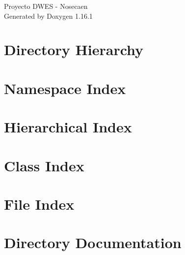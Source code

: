 \documentclass[twoside]{book}
\newcommand{\+}{\discretionary{\mbox{\scriptsize$\hookleftarrow$}}{}{}}
\newcommand{\clearemptydoublepage}{%
    \newpage{\pagestyle{empty}\cleardoublepage}%
  }
\begin{document}
  \raggedbottom
    \hypersetup{pageanchor=false,
                bookmarksnumbered=true,
                pdfencoding=unicode
               }
  \begin{titlepage}
  \vspace*{7cm}
  \begin{center}%
  {\Large Proyecto DWES -\/ Nosecaen}\\
  \vspace*{1cm}
  {\large Generated by Doxygen 1.16.1}\\
  \end{center}
  \end{titlepage}
  \clearemptydoublepage
  \tableofcontents
  \clearemptydoublepage
  \hypersetup{pageanchor=true}
\chapter{Directory Hierarchy}

\chapter{Namespace Index}

\chapter{Hierarchical Index}

\chapter{Class Index}

\chapter{File Index}

\chapter{Directory Documentation}















\end{document}
